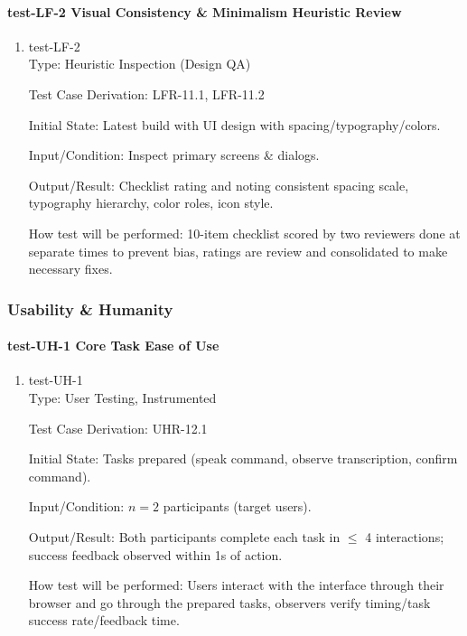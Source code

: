 \documentclass[12pt, titlepage]{article}
\begin{document}
\paragraph{test-LF-2 Visual Consistency \& Minimalism Heuristic Review}

\begin{enumerate}
\item{test-LF-2\\}
Type: Heuristic Inspection (Design QA)

Test Case Derivation: LFR-11.1, LFR-11.2

Initial State: Latest build with UI design with spacing/typography/colors.

Input/Condition: Inspect primary screens \& dialogs.

Output/Result: Checklist rating and noting consistent spacing scale, typography hierarchy, color roles, icon style.

How test will be performed: 10-item checklist scored by two reviewers done at separate times to prevent bias, ratings are review and consolidated to make necessary fixes.
\end{enumerate}

\subsubsection{Usability \& Humanity}

\paragraph{test-UH-1 Core Task Ease of Use}

\begin{enumerate}
\item{test-UH-1\\}
Type: User Testing, Instrumented

Test Case Derivation: UHR-12.1

Initial State: Tasks prepared (speak command, observe transcription, confirm command).

Input/Condition: $n=2$ participants (target users).

Output/Result: Both participants complete each task in $\leq$ 4 interactions; success feedback observed within 1s of action.

How test will be performed: Users interact with the interface through their browser and go through the prepared tasks, observers verify timing/task success rate/feedback time.
\end{enumerate}
\end{document}
